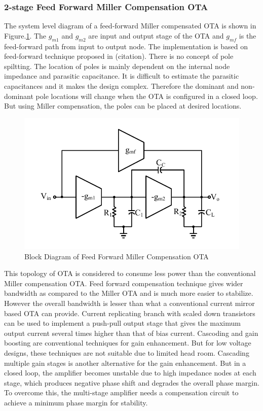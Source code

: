 \subsubsection{2-stage Feed Forward Miller Compensation OTA}

The system level diagram of a feed-forward Miller compensated OTA is shown in Figure.\ref{fig:FFMCO}. The $g_{m1}$ and $g_{m2}$ are input and output stage of the OTA and $g_{mf}$ is the feed-forward path from input to output node. The implementation is based on feed-forward technique proposed in (citation). There is no concept of pole spiltting. The location of poles is mainly dependent on the internal node impedance and parasitic capacitance. It is difficult to estimate the parasitic capacitances and it makes the design complex. Therefore the dominant and non-dominant pole locations will change when the OTA is configured in a closed loop. But using Miller compensation, the poles can be placed at desired locations.

\begin{figure} [H]
\centering
\includegraphics[scale=1]{Figures/Misc/PDFs/FFMCO.pdf}
\caption{Block Diagram of Feed Forward Miller Compensation OTA}
\label{fig:FFMCO}
\end{figure}

This topology of OTA is considered to consume less power than the conventional Miller compensation OTA. Feed forward compensation technique gives wider bandwidth as compared to the Miller OTA and is much more easier to stabilize.  However the overall bandwidth is lesser than what a conventional current mirror based OTA can provide. Current replicating branch with scaled down transistors can be used to implement a push-pull output stage that gives the maximum output current several times higher than that of bias current. Cascoding and gain boosting are conventional techniques for gain enhancement. But for low voltage designs, these techniques are not suitable due to limited head room. Cascading multiple gain stages is another alternative for the gain enhancement. But in a closed loop, the amplifier becomes unstable due to high impedance nodes at each stage, which produces negative phase shift and degrades the overall phase margin. To overcome this, the multi-stage amplifier needs a compensation circuit to achieve a minimum phase margin for stability.

